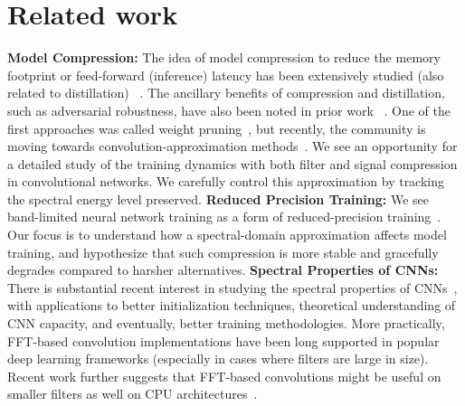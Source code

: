 \section{Related work}
\textbf{Model Compression: } The idea of model compression to reduce the memory footprint or feed-forward (inference) latency has been extensively studied (also related to distillation) ~\cite{he2018amc, hinton2015distilling, sindhwani2015structured, chen2015compressing}. 
The ancillary benefits of compression and distillation, such as adversarial robustness, have also been noted in prior work~\cite{huang2017adversarial, madry2017towards, papernot2015distillation}%
. 
One of the first approaches was called weight pruning~\cite{han2015deep}, but recently, the community is moving towards convolution-approximation methods~\cite{liu2018efficient,chen2016compressing}. We see an opportunity for a detailed study of the training dynamics with both filter and signal compression in convolutional networks. We carefully control this approximation by tracking the spectral energy level preserved.
\newline
\textbf{Reduced Precision Training: } We see band-limited neural network training as a form of reduced-precision training~\cite{hubara2017quantized, sato2017depth, alistarh2018convergence, de2018high}. Our focus is to understand how a spectral-domain approximation affects model training, and hypothesize that such compression is more stable and gracefully degrades compared to harsher alternatives.
\newline
\textbf{Spectral Properties of CNNs: }
\label{whyFFTConvolution}
There is substantial recent interest in studying the spectral properties of CNNs~\cite{rippel2015spectral,rahaman2018spectral,xu2018training}, with applications to better initialization techniques, theoretical understanding of CNN capacity, and eventually, better training methodologies. More practically, FFT-based convolution implementations have been long supported in popular deep learning frameworks (especially in cases where filters are large in size). Recent work further suggests that FFT-based convolutions might be useful on smaller filters as well on CPU architectures~\cite{aleks2018fft}. 
